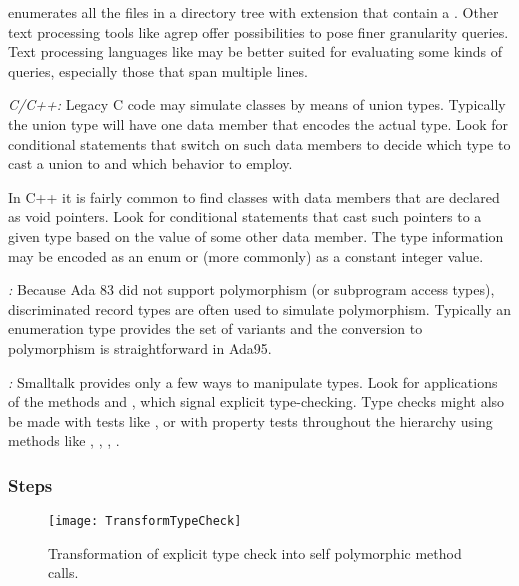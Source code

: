 \documentclass[a4paper,10pt,twoside]{book}
\begin{document}
\begin{bulletlist}
enumerates all the files in a directory tree with extension  that contain a . Other text processing tools like agrep offer possibilities to pose finer granularity queries. Text processing languages like  may be better suited for evaluating some kinds of queries, especially those that span multiple lines. 

\item \emph{C/C++:}
Legacy C code may simulate classes by means of union types. Typically the union type will have one data member that encodes the actual type. Look for conditional statements that switch on such data members to decide which type to cast a union to and which behavior to employ.

In C++ it is fairly common to find classes with data members that are declared as void pointers. Look for conditional statements that cast such pointers to a given type based on the value of some other data member. The type information may be encoded as an enum or (more commonly) as a constant integer value.

\item \emph{:}
Because Ada 83 did not support polymorphism (or subprogram access types), discriminated record types are often used to simulate polymorphism. Typically an enumeration type provides the set of variants and the conversion to polymorphism is straightforward in Ada95.

\item \emph{:}
Smalltalk provides only a few ways to manipulate types. Look for applications of the methods  and , which signal explicit type-checking. Type checks might also be made with tests like , or with property tests throughout the hierarchy using methods like , , , .
\end{bulletlist}

\subsubsection*{Steps}

\begin{figure}[tb]
\begin{center}
\texttt{[image: TransformTypeCheck]}
\caption{Transformation of explicit type check into self polymorphic method calls.}
\end{center}
\end{figure}
\end{document}
